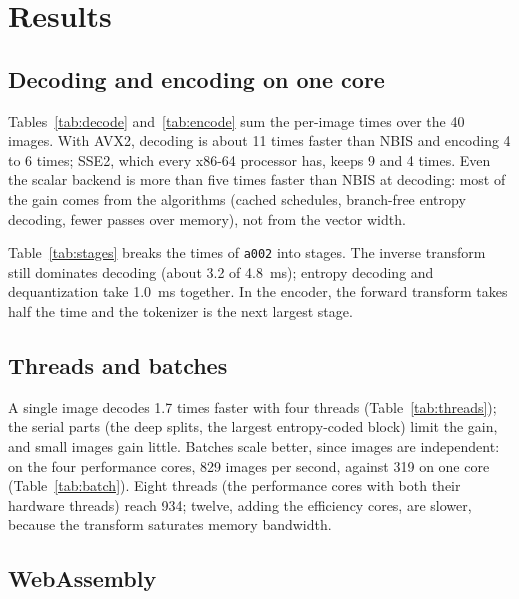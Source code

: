 \section{Results}
\label{sec:results}

\subsection{Decoding and encoding on one core}

Tables~\ref{tab:decode} and~\ref{tab:encode} sum the per-image times over the 40 images. With
AVX2, decoding is about 11 times faster than NBIS and encoding 4 to 6 times; SSE2, which every
x86-64 processor has, keeps 9 and 4 times. Even the scalar backend is more than five times
faster than NBIS at decoding: most of the gain comes from the algorithms (cached schedules,
branch-free entropy decoding, fewer passes over memory), not from the vector width.




Table~\ref{tab:stages} breaks the times of \texttt{a002} into stages. The inverse transform
still dominates decoding (about 3.2 of 4.8~ms); entropy decoding and dequantization take
1.0~ms together. In the encoder, the forward transform takes half the time and the tokenizer is
the next largest stage.



\subsection{Threads and batches}

A single image decodes 1.7 times faster with four threads (Table~\ref{tab:threads}); the
serial parts (the deep splits, the largest entropy-coded block) limit the gain, and small
images gain little. Batches scale better, since images are independent: on the four performance
cores, 829 images per second, against 319 on one core (Table~\ref{tab:batch}). Eight threads
(the performance cores with both their hardware threads) reach 934; twelve, adding the
efficiency cores, are slower, because the transform saturates memory bandwidth.




\subsection{WebAssembly}

